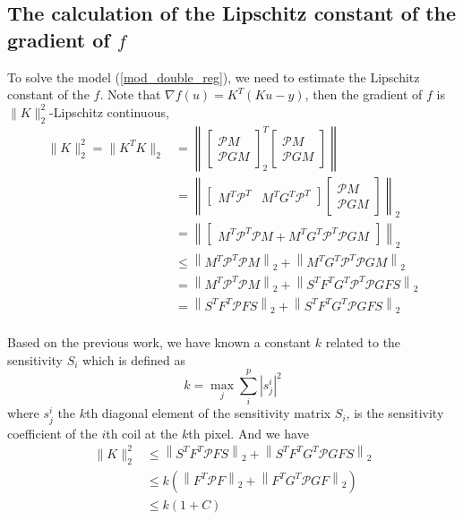 \documentclass[UTF8]{article}
\renewcommand{\le}{\leqslant}
\renewcommand{\le}{\leqslant}
\begin{document}
\subsection{The calculation of the Lipschitz constant of the gradient of $f$}
\par To solve the model (\ref{mod_double_reg}), we need to estimate the Lipschitz constant of the $f$. Note that $\nabla f(u) = K^T(Ku - y)$, then the gradient of $f$ is $\|K\|^2_2$-Lipschitz continuous, 
\begin{equation*}
	\begin{aligned}
	\|K\|^2_2 = \| K^T K\|_2 &= \left \| 
	\begin{bmatrix}
		\mathcal{P} M \\
		\mathcal{P} GM
	\end{bmatrix}^T_2
	\begin{bmatrix}
		\mathcal{P} M \\
		\mathcal{P} GM
	\end{bmatrix} \right\| \\
		 & =\left\| 
		 \begin{bmatrix}
			  M^T\mathcal{P}^T &
			  M^T G^T\mathcal{P}^T
		 \end{bmatrix} 
	 	\begin{bmatrix}
	 		\mathcal{P} M \\
	 		\mathcal{P} GM
	 	\end{bmatrix}
		\right\|_2 \\
		& = \left\|
		\begin{bmatrix}
			M^T \mathcal{P}^T \mathcal{P}M + M^T G^T\mathcal{P}^T \mathcal{P}GM
		\end{bmatrix}
		\right\|_2 \\
		&\le  
		\left \|
			M^T \mathcal{P}^T \mathcal{P}M 
		\right\|_2
		+
		\left \|
			M^T G^T\mathcal{P}^T \mathcal{P}GM 
		\right\|_2 \\
		& = \left \|
		M^T \mathcal{P}^T \mathcal{P}M 
		\right\|_2 +  \left \|
		S^TF^T G^T\mathcal{P}^T \mathcal{P}GFS
		\right\|_2 \\
		& = \left \|
		S^TF^T  \mathcal{P}FS
		\right\|_2+  \left \|
		S^TF^T G^T \mathcal{P}GFS
		\right\|_2 \\
	\end{aligned}
\end{equation*}
\par Based on the previous work, we have known a constant $k$ related to the sensitivity $S_i$ which is defined as 
\begin{equation}
	k=\max_j \sum_{i}^{p}| s_j^i|^2
\end{equation}
where $s_j^i$  the $k$th diagonal element of the sensitivity matrix $S_i$, is the sensitivity coefficient of the $i$th coil at the $k$th pixel. And we have 
\begin{equation}
	\begin{aligned}
	\|K\|^2_2 &\le  \left \|
	S^TF^T  \mathcal{P}FS
	\right\|_2+  \left \|
	S^TF^T G^T \mathcal{P}GFS
	\right\|_2 \\
	&\le k(\left \|
	F^T  \mathcal{P}F
	\right\|_2+  \left \|
	F^T G^T \mathcal{P}GF
	\right\|_2) \\
	&\le k(1+C)
	\end{aligned}
\end{equation}
\end{document}
